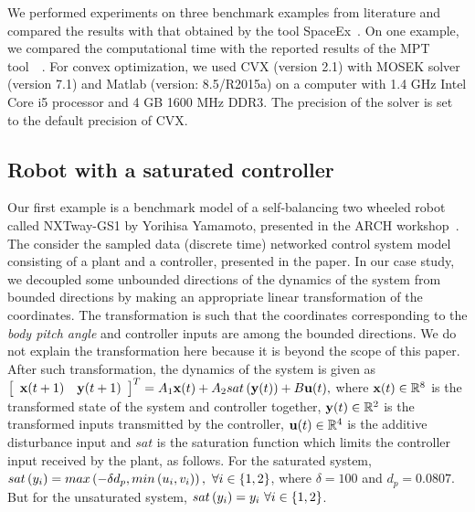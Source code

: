 We performed experiments on three benchmark examples from literature
and compared the results with that obtained by the tool
SpaceEx~\cite{TODO}. On one example, we compared the computational
time with the reported results of the MPT
tool~~\cite{rakovic2004computation}.  For convex optimization, we used
CVX (version 2.1) with MOSEK solver (version 7.1) and Matlab (version:
8.5/R2015a) on a computer with 1.4 GHz Intel Core i5 processor and 4 GB
1600 MHz DDR3.  The precision of the solver is set to the default
precision of CVX.


\subsection{Robot with a saturated controller}   Our first example is a benchmark
model of a self-balancing two wheeled robot called NXTway-GS1 by
Yorihisa Yamamoto, presented in the ARCH
workshop~\cite{heinz2014benchmark}.  The consider the sampled data
(discrete time) networked control system model consisting of a plant
and a controller, presented in the paper.   In our case study, we
decoupled some unbounded directions of the dynamics of the system from
bounded directions by making an appropriate linear transformation of
the coordinates.  The transformation is such that the coordinates
corresponding to the \emph{body pitch angle} and controller inputs are
among the bounded directions.  We do not explain the transformation
here because it is beyond the scope of this paper.  After such
transformation, the dynamics of the system is given as $
\left[\begin{array}{cc}{\bf x}(t+1) &
    {\bf y}(t+1)\end{array}\right]^T=A_1{\bf x}(t)+A_2sat\left({\bf y}(t)\right)+B{\bf u}(t),$
where ${\bf x}(t)\in\mathbb{R}^8$ is the transformed state of the system
and controller together, ${\bf y}(t)\in\mathbb{R}^2$ is the transformed
inputs transmitted by the controller, ${\bf u}(t)\in\mathbb{R}^4$ is the
additive disturbance input and $sat$ is the saturation function which
limits the controller input received by the plant, as follows.  For
the saturated system, $sat\left(y_i\right) = max\left(-\delta
d_p,min\left(u_i,v_i\right)\right),~\forall i\in\{1,2\}$, where $\delta=100$ and
$d_p=0.0807$.  But for the unsaturated system,
$sat\left(y_i\right)=y_i~\forall i\in\{1,2\}$.
%

